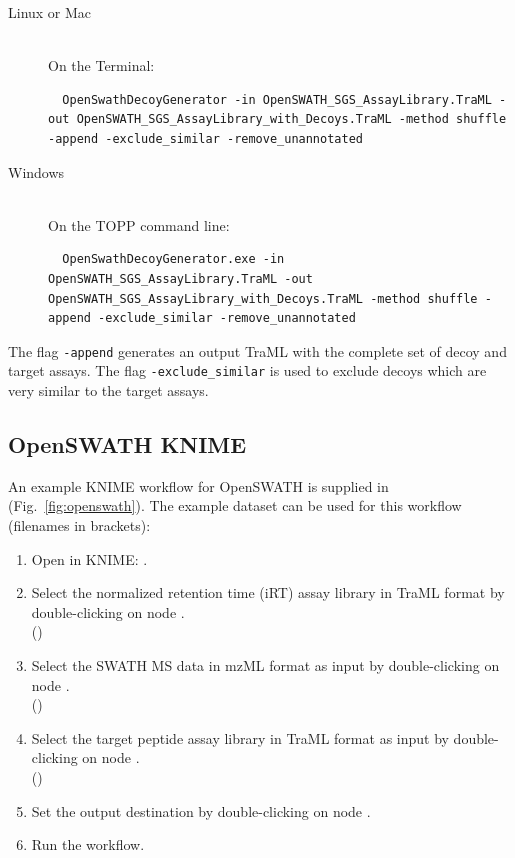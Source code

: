 \begin{description}
  \item[Linux or Mac] \hfill \\
    On the Terminal:
    \begin{lstlisting}
  OpenSwathDecoyGenerator -in OpenSWATH_SGS_AssayLibrary.TraML -out OpenSWATH_SGS_AssayLibrary_with_Decoys.TraML -method shuffle -append -exclude_similar -remove_unannotated
  \end{lstlisting}
  \item[Windows] \hfill \\
    On the TOPP command line:
    \begin{lstlisting}
  OpenSwathDecoyGenerator.exe -in OpenSWATH_SGS_AssayLibrary.TraML -out OpenSWATH_SGS_AssayLibrary_with_Decoys.TraML -method shuffle -append -exclude_similar -remove_unannotated
  \end{lstlisting}
\end{description}

The flag \texttt{-append} generates an output TraML with the complete set of decoy and target assays. The flag \texttt{-exclude\_similar} is used to exclude decoys which are very similar to the target assays.  

\subsection{OpenSWATH KNIME}
An example KNIME workflow for OpenSWATH is supplied in  (Fig.~\ref{fig:openswath}). The example dataset can be used for this workflow (filenames in brackets):

\begin{enumerate}
  \item Open  in KNIME: .
  \item Select the normalized retention time (iRT) assay library in TraML format by double-clicking on node .\\
  ()
  \item Select the SWATH MS data in mzML format as input by double-clicking on node .\\
  ()
  \item Select the target peptide assay library in TraML format  as input by double-clicking on node .\\
  ()
  \item Set the output destination by double-clicking on node .\\
  \item Run the workflow.
\end{enumerate}


